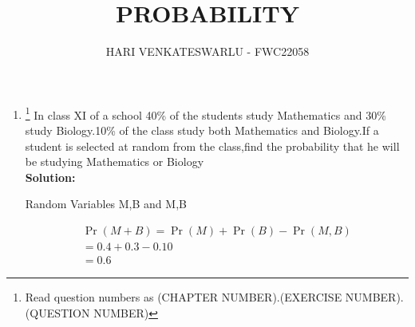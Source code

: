 \documentclass{article}
\providecommand{\pr}[1]{\ensuremath{\Pr\left(#1\right)}}
\newcommand{\solution}{\noindent \textbf{Solution: }}
\providecommand{\pr}[1]{\ensuremath{\Pr\left(#1\right)}}
\begin{document}
\title{PROBABILITY}
\author{\Large HARI VENKATESWARLU - FWC22058}
\date{}

\maketitle

\begin{enumerate}[label=16.\arabic{enumi}.\arabic{enumii}]%
\setcounter{enumi}{2}
\setcounter{enumii}{18}

\item \footnote{Read question numbers as (CHAPTER NUMBER).(EXERCISE NUMBER).(QUESTION NUMBER)} {In class XI of a school 40\% of the students study Mathematics and 30\% study Biology.10\% of the class study both Mathematics and Biology.If a student is selected at random from the class,find the probability that he will be studying Mathematics or Biology}\\[1ex]
	\solution\\
	
\begin{table}[h]\centering
	
	\caption{Random Variables M,B and M,B}\label{table1:}
\end{table}
	\begin{align}
	  &\pr{M+B}=\pr{M}+\pr{B}-\pr{M,B}&\\
	  &=0.4+0.3-0.10&\\
	  &=0.6&
\end{align}
\end{enumerate}
\end{document}
